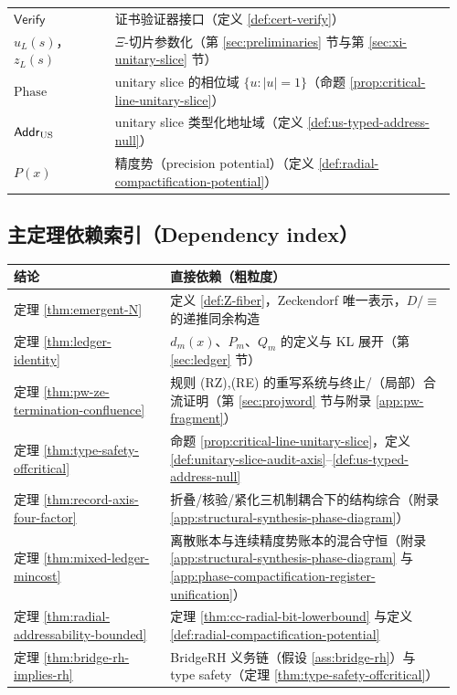 \begin{tabular}{>{\raggedright\arraybackslash}p{0.22\linewidth} p{0.74\linewidth}}
$\mathsf{Verify}$ & 证书验证器接口（定义 \ref{def:cert-verify}）\\
$u_L(s)$，$z_L(s)$ & $\Xi$-切片参数化（第 \ref{sec:preliminaries} 节与第 \ref{sec:xi-unitary-slice} 节）\\
$\mathrm{Phase}$ & unitary slice 的相位域 $\{u:|u|=1\}$（命题 \ref{prop:critical-line-unitary-slice}）\\
$\mathsf{Addr}_{\mathrm{US}}$ & unitary slice 类型化地址域（定义 \ref{def:us-typed-address-null}）\\
$P(x)$ & 精度势（precision potential）（定义 \ref{def:radial-compactification-potential}）\\
\bottomrule
\end{tabular}

\subsection*{主定理依赖索引（Dependency index）}
\begin{tabular}{>{\raggedright\arraybackslash}p{0.34\linewidth} p{0.62\linewidth}}
\toprule
结论 & 直接依赖（粗粒度）\\
\midrule
定理 \ref{thm:emergent-N} & 定义 \ref{def:Z-fiber}，Zeckendorf 唯一表示，$D/\!\equiv$ 的递推同余构造\\
定理 \ref{thm:ledger-identity} & $d_m(x)$、$P_m$、$Q_m$ 的定义与 KL 展开（第 \ref{sec:ledger} 节）\\
定理 \ref{thm:pw-ze-termination-confluence} & 规则 (RZ),(RE) 的重写系统与终止/（局部）合流证明（第 \ref{sec:projword} 节与附录 \ref{app:pw-fragment}）\\
定理 \ref{thm:type-safety-offcritical} & 命题 \ref{prop:critical-line-unitary-slice}，定义 \ref{def:unitary-slice-audit-axis}--\ref{def:us-typed-address-null}\\
定理 \ref{thm:record-axis-four-factor} & 折叠/核验/紧化三机制耦合下的结构综合（附录 \ref{app:structural-synthesis-phase-diagram}）\\
定理 \ref{thm:mixed-ledger-mincost} & 离散账本与连续精度势账本的混合守恒（附录 \ref{app:structural-synthesis-phase-diagram} 与 \ref{app:phase-compactification-register-unification}）\\
定理 \ref{thm:radial-addressability-bounded} & 定理 \ref{thm:cc-radial-bit-lowerbound} 与定义 \ref{def:radial-compactification-potential}\\
定理 \ref{thm:bridge-rh-implies-rh} & BridgeRH 义务链（假设 \ref{ass:bridge-rh}）与 type safety（定理 \ref{thm:type-safety-offcritical}）\\
\bottomrule
\end{tabular}

